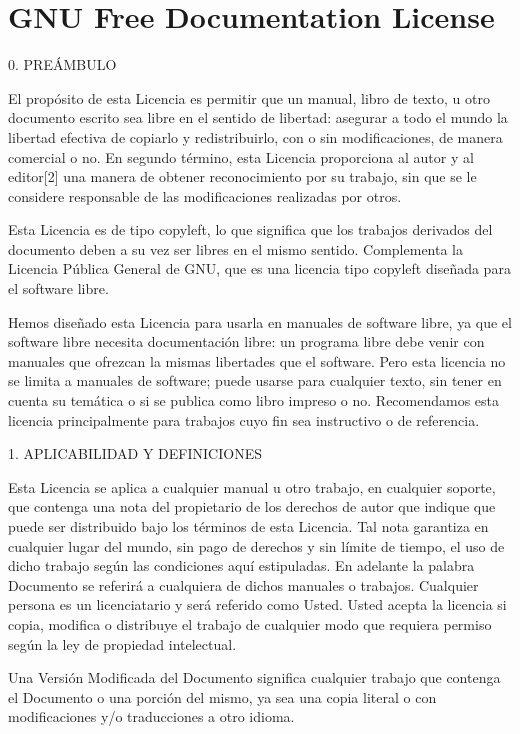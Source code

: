 \documentclass[a4paper, 11pt, oneside]{report}
\begin{document}
\chapter{GNU Free Documentation License}

0. PREÁMBULO

El propósito de esta Licencia es permitir que un manual, libro de texto, u otro documento escrito sea libre en el sentido de libertad: asegurar a todo el mundo la libertad efectiva de copiarlo y redistribuirlo, con o sin modificaciones, de manera comercial o no. En segundo término, esta Licencia proporciona al autor y al editor[2] una manera de obtener reconocimiento por su trabajo, sin que se le considere responsable de las modificaciones realizadas por otros.

Esta Licencia es de tipo copyleft, lo que significa que los trabajos derivados del documento deben a su vez ser libres en el mismo sentido. Complementa la Licencia Pública General de GNU, que es una licencia tipo copyleft diseñada para el software libre.

Hemos diseñado esta Licencia para usarla en manuales de software libre, ya que el software libre necesita documentación libre: un programa libre debe venir con manuales que ofrezcan la mismas libertades que el software. Pero esta licencia no se limita a manuales de software; puede usarse para cualquier texto, sin tener en cuenta su temática o si se publica como libro impreso o no. Recomendamos esta licencia principalmente para trabajos cuyo fin sea instructivo o de referencia.

1. APLICABILIDAD Y DEFINICIONES

Esta Licencia se aplica a cualquier manual u otro trabajo, en cualquier soporte, que contenga una nota del propietario de los derechos de autor que indique que puede ser distribuido bajo los términos de esta Licencia. Tal nota garantiza en cualquier lugar del mundo, sin pago de derechos y sin límite de tiempo, el uso de dicho trabajo según las condiciones aquí estipuladas. En adelante la palabra Documento se referirá a cualquiera de dichos manuales o trabajos. Cualquier persona es un licenciatario y será referido como Usted. Usted acepta la licencia si copia, modifica o distribuye el trabajo de cualquier modo que requiera permiso según la ley de propiedad intelectual.

Una Versión Modificada del Documento significa cualquier trabajo que contenga el Documento o una porción del mismo, ya sea una copia literal o con modificaciones y/o traducciones a otro idioma.
\end{document}
